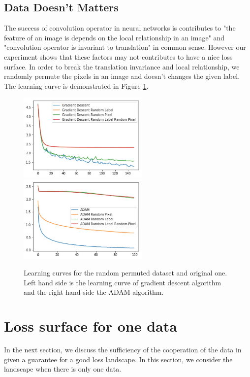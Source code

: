 \documentclass{article}
\theoremstyle{plain}
\theoremstyle{definition}
\begin{document}
\subsection{Data Doesn't Matters}

The success of convolution operator in neural networks is contributes to "the feature of an image is depends on the local relationship in an image" and "convolution operator is invariant to translation" in common sense. However our experiment shows that these factors may not contributes to have a nice loss surface. In order to break the translation invariance and local relationship, we randomly permute the pixels in an image and doesn't changes the given label. The learning curve is demonstrated in Figure \ref{randomperb}.

\begin{figure}[htp]
	\centering
	\includegraphics[width=2.5in]{gdrp.jpg}
	\includegraphics[width=2.5in]{adamrp.jpg}
	\caption{Learning curves for the random permuted dataset and original one. Left hand side is the learning curve of gradient descent algorithm and the right hand side the ADAM algorithm.}
	\label{randomperb}
\end{figure}


\section{Loss surface for one data}

In the next section, we discuss the sufficiency of the cooperation of the data in given a guarantee for a good loss landscape. In this section, we consider the landscape when there is only one data.
\end{document}

